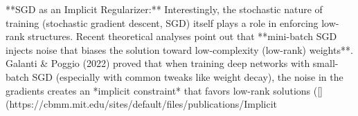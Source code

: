 **SGD as an Implicit Regularizer:** Interestingly, the stochastic nature of training (stochastic gradient descent, SGD) itself plays a role in enforcing low-rank structures. Recent theoretical analyses point out that **mini-batch SGD injects noise that biases the solution toward low-complexity (low-rank) weights**. Galanti & Poggio (2022) proved that when training deep networks with small-batch SGD (especially with common tweaks like weight decay), the noise in the gradients creates an *implicit constraint* that favors low-rank solutions ([](https://cbmm.mit.edu/sites/default/files/publications/Implicit%

